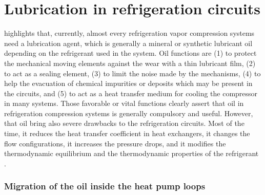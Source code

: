 \section{Lubrication in refrigeration circuits}

\citet{YoubiIdrissi-Bonjour-2008a} highlights that, currently, almost
every refrigeration vapor compression systems need a lubrication
agent, which is generally a mineral or synthetic lubricant oil
depending on the refrigerant used in the system. Oil functions are (1)
to protect the mechanical moving elements against the wear with a thin
lubricant film, (2) to act as a sealing element, (3) to limit the
noise made by the mechanisms, (4) to help the evacuation of chemical
impurities or deposits which may be present in the circuits, and (5)
to act as a heat transfer medium for cooling the compressor in many
systems. Those favorable or vital functions clearly assert that oil in
refrigeration compression systems is generally compulsory and
useful. However, that oil bring also severe drawbacks to the
refrigeration circuits. Most of the time, it reduces the heat transfer
coefficient in heat exchangers, it changes the flow configurations, it
increases the pressure drops, and it modifies the thermodynamic
equilibrium and the thermodynamic properties of the refrigerant
\citep{YoubiIdrissi-Bonjour-2008a}.

\subsubsection{Migration of the oil inside the heat pump loops}
\label{sec:migration}

